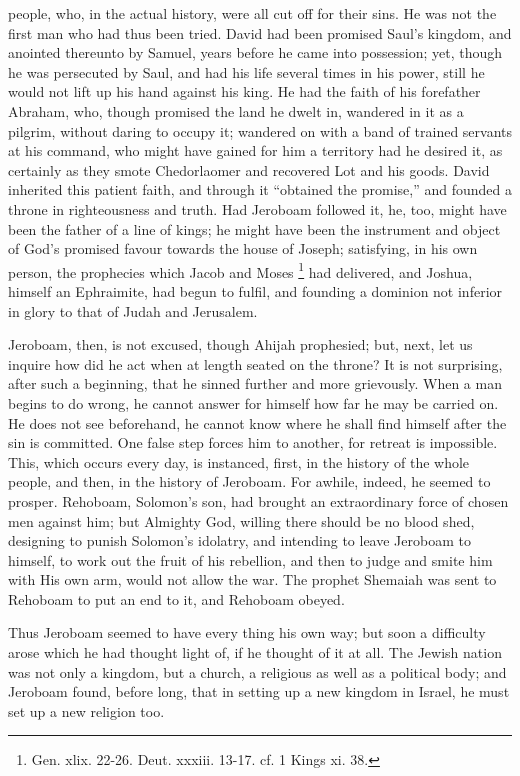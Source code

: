 people, who, in the actual history, were all cut off for their sins.
He was not the first man who had thus been tried. David had been
promised Saul's kingdom, and anointed thereunto by Samuel, years
before he came into possession; yet, though he was persecuted by Saul,
and had his life several times in his power, still he would not lift
up his hand against his king. He had the faith of his forefather
Abraham, who, though promised the land he dwelt in, wandered in it as
a pilgrim, without daring to occupy it; wandered on with a band of
trained servants at his command, who might have gained for him a
territory had he desired it, as certainly as they smote Chedorlaomer
and recovered Lot and his goods. David inherited this patient faith,
and through it ``obtained the promise,'' and founded a throne
in righteousness and truth. Had Jeroboam followed it, he, too, might
have been the father of a line of kings; he might have been the
instrument and object of God's promised favour towards the house of
Joseph; satisfying, in his own person, the prophecies which Jacob and
Moses \footnote{Gen. xlix. 22-26. Deut. xxxiii. 13-17. cf. 1 Kings xi. 38.} had delivered, and
Joshua, himself an Ephraimite, had begun to fulfil, and founding a
dominion not inferior in glory to that of Judah and Jerusalem.

Jeroboam, then, is not excused, though Ahijah prophesied; but,
next, let us inquire how did he act when at length seated on the
throne? It is not surprising, after such a beginning, that he sinned
further and more grievously. When a man begins to do wrong, he cannot
answer for himself how far he may be carried on. He does not see
beforehand, he cannot know where he shall find himself after the sin
is committed. One false step forces him to another, for retreat is
impossible. This, which occurs every day, is instanced, first, in the
history of the whole people, and then, in the history of Jeroboam. For
awhile, indeed, he seemed to prosper. Rehoboam, Solomon's son, had
brought an extraordinary force of chosen men against him; but Almighty
God, willing there should be no blood shed, designing to punish
Solomon's idolatry, and intending to leave Jeroboam to himself, to
work out the fruit of his rebellion, and then to judge and smite him
with His own arm, would not allow the war. The prophet Shemaiah was
sent to Rehoboam to put an end to it, and Rehoboam obeyed.

Thus Jeroboam seemed to have every thing his own way; but soon a
difficulty arose which he had thought light of, if he thought of it at
all. The Jewish nation was not only a kingdom, but a church, a
religious as well as a political body; and Jeroboam found, before
long, that in setting up a new kingdom in Israel, he must set up a new
religion too.

